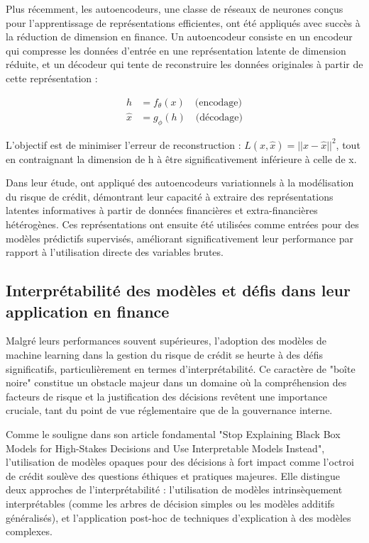 Plus récemment, les autoencodeurs, une classe de réseaux de neurones conçus pour l'apprentissage de représentations efficientes, ont été appliqués avec succès à la réduction de dimension en finance. Un autoencodeur consiste en un encodeur qui compresse les données d'entrée en une représentation latente de dimension réduite, et un décodeur qui tente de reconstruire les données originales à partir de cette représentation :

\begin{align}
h &= f_{\theta}(x) \quad \text{(encodage)}\\
\hat{x} &= g_{\phi}(h) \quad \text{(décodage)}
\end{align}

L'objectif est de minimiser l'erreur de reconstruction : $L(x, \hat{x}) = ||x - \hat{x}||^2$, tout en contraignant la dimension de h à être significativement inférieure à celle de x.

Dans leur étude, \citet{petropoulos2019} ont appliqué des autoencodeurs variationnels à la modélisation du risque de crédit, démontrant leur capacité à extraire des représentations latentes informatives à partir de données financières et extra-financières hétérogènes. Ces représentations ont ensuite été utilisées comme entrées pour des modèles prédictifs supervisés, améliorant significativement leur performance par rapport à l'utilisation directe des variables brutes.

\subsection{Interprétabilité des modèles et défis dans leur application en finance}

Malgré leurs performances souvent supérieures, l'adoption des modèles de machine learning dans la gestion du risque de crédit se heurte à des défis significatifs, particulièrement en termes d'interprétabilité. Ce caractère de "boîte noire" constitue un obstacle majeur dans un domaine où la compréhension des facteurs de risque et la justification des décisions revêtent une importance cruciale, tant du point de vue réglementaire que de la gouvernance interne.

Comme le souligne \citet{rudin2019} dans son article fondamental "Stop Explaining Black Box Models for High-Stakes Decisions and Use Interpretable Models Instead", l'utilisation de modèles opaques pour des décisions à fort impact comme l'octroi de crédit soulève des questions éthiques et pratiques majeures. Elle distingue deux approches de l'interprétabilité : l'utilisation de modèles intrinsèquement interprétables (comme les arbres de décision simples ou les modèles additifs généralisés), et l'application post-hoc de techniques d'explication à des modèles complexes.

